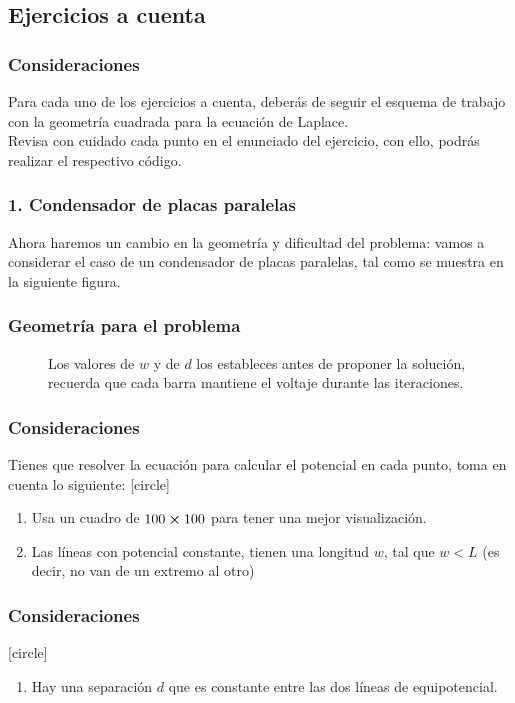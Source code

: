 {\subsection{Ejercicios a cuenta}
\begin{frame}
\frametitle{Consideraciones}
Para cada uno de los ejercicios a cuenta, deberás de seguir el esquema de trabajo con la geometría cuadrada para la ecuación de Laplace.
\\
\bigskip
Revisa con cuidado cada punto en el enunciado del ejercicio, con ello, podrás realizar el respectivo código.
\end{frame}
\begin{frame}
\frametitle{1. Condensador de placas paralelas}
Ahora haremos un cambio en la geometría y dificultad del problema: vamos a considerar el caso de un condensador de placas paralelas, tal como se muestra en  la siguiente figura.
\end{frame}
\begin{frame}
\frametitle{Geometría para el problema}
\begin{figure}
	\centering
	
	\caption{Los valores de $w$ y de $d$ los estableces antes de proponer la solución, recuerda que cada barra mantiene el voltaje durante las iteraciones.}
\end{figure}
\end{frame}
\begin{frame}
\frametitle{Consideraciones}
Tienes que resolver la ecuación para calcular el potencial en cada punto, toma en cuenta lo siguiente:
[circle]
\begin{enumerate}[<+->]
\item Usa un cuadro de $100 \cp 100$ para tener una mejor visualización.
\item Las líneas con potencial constante, tienen una longitud $w$, tal que $w < L$  (es decir, no van de un extremo al otro)
\seti
\end{enumerate}
\end{frame}
\begin{frame}
\frametitle{Consideraciones}
[circle]
\begin{enumerate}[<+->]
\conti
\item Hay una separación $d$ que es constante entre las dos líneas de equipotencial.

\end{enumerate}
\end{frame}}
